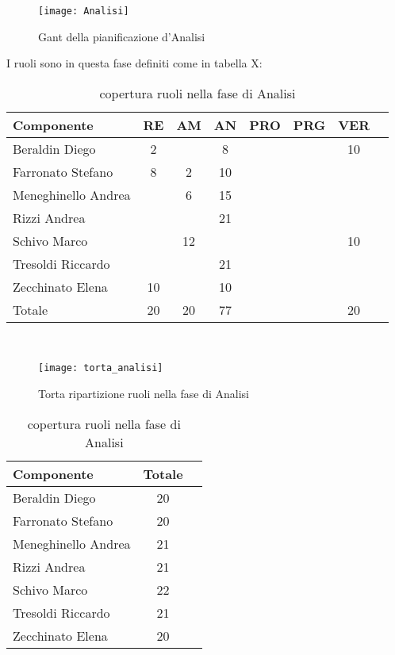 \begin{figure}[h]
  \texttt{[image: Analisi]}
\caption{Gant della pianificazione d'Analisi }
\end{figure}

I ruoli sono in questa fase definiti come in tabella X:\\
\begin{table}[h]
\centering
\begin{tabular}{|l|c|c|c|c|c|cl|}
\hline
Componente& RE& AM& AN& PRO& PRG& VER& \\
\hline
Beraldin Diego & 2& & 8& & & 10&\\
Farronato Stefano & 8& 2& 10& & & &\\
Meneghinello Andrea & & 6& 15& & & &\\
Rizzi Andrea & & & 21& & & &\\
Schivo Marco & & 12& & & & 10&\\
Tresoldi Riccardo & & & 21& & & &\\
Zecchinato Elena & 10& & 10& & & &\\
\hline
Totale & 20& 20& 77& & & 20&\\
\hline
\end{tabular}
\caption{copertura ruoli nella fase di Analisi}
\end{table}\\

\begin{figure}[h]
  \texttt{[image: torta\_analisi]}
\caption{Torta ripartizione ruoli nella fase di Analisi}
\end{figure}

\begin{table}[h]
\centering
\begin{tabular}{|l|cl|}
\hline
Componente& Totale& \\
\hline
Beraldin Diego & 20&\\
Farronato Stefano & 20&\\
Meneghinello Andrea & 21&\\
Rizzi Andrea &  21&\\
Schivo Marco & 22&\\
Tresoldi Riccardo & 21&\\
Zecchinato Elena & 20&\\
\hline
\end{tabular}
\caption{copertura ruoli nella fase di Analisi}
\end{table}

